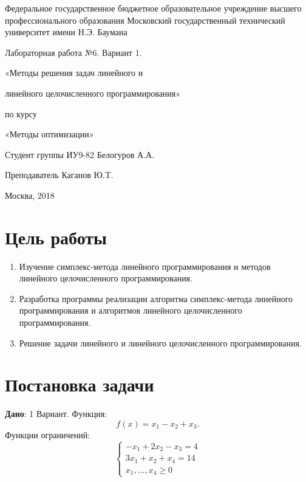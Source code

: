 \documentclass[a4paper, 12pt]{article}   	%
\begin{document}
\begin{titlepage}

\thispagestyle{empty}

\begin{center}
Федеральное государственное бюджетное образовательное учреждение высшего профессионального образования Московский государственный технический университет имени Н.Э. Баумана
\end{center}


\vfill

\centerline{\large{Лабораторная работа №6. Вариант 1.}}

\centerline{\large{«Методы решения задач линейного и}} 
\centerline{\large{линейного целочисленного программирования»}} 

\centerline{\large{по курсу}}
\centerline{\large{«Методы оптимизации»}}


\vfill

Студент группы ИУ9-82 \hfill Белогуров А.А.

Преподаватель \hfill Каганов Ю.T. 
\vfill

\centerline{Москва, 2018}
\clearpage
\end{titlepage}

\newpage
\setcounter{page}{2}

\tableofcontents

\newpage

\section{Цель работы}

\begin{enumerate}
    \item Изучение симплекс-метода линейного программирования и методов линейного целочисленного программирования.
    \item Разработка программы реализации алгоритма симплекс-метода линейного программирования и алгоритмов линейного целочисленного программирования.
    \item Решение задачи линейного и линейного целочисленного программирования. 
\end{enumerate}

\newpage

\section{Постановка задачи}
    \textbf {Дано}: 1 Вариант. Функция:
    \begin{equation}
        f(x) = x_1 - x_2 + x_3.
    \end{equation}
    Функции ограничений:
    \begin{equation}
        \begin{cases}
            -x_1 + 2x_2 - x_3 = 4 \\
            3 x_1 + x_2 + x_4 = 14 \\
            x_1, ..., x_4 \geq 0
        \end{cases}
    \end{equation}
    
\end{document}
